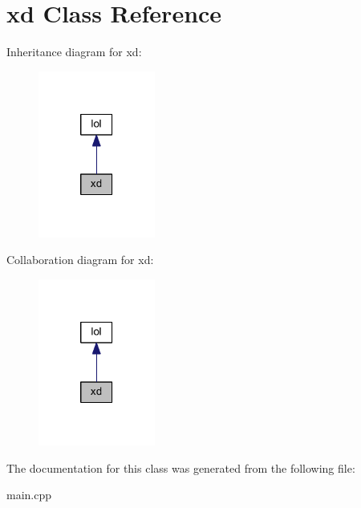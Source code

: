 \hypertarget{classxd}{}\section{xd Class Reference}
\label{classxd}


Inheritance diagram for xd\+:\nopagebreak
\begin{figure}[H]
\begin{center}
\leavevmode
\includegraphics[width=109pt]{classxd__inherit__graph}
\end{center}
\end{figure}


Collaboration diagram for xd\+:\nopagebreak
\begin{figure}[H]
\begin{center}
\leavevmode
\includegraphics[width=109pt]{classxd__coll__graph}
\end{center}
\end{figure}


The documentation for this class was generated from the following file\+:\begin{DoxyCompactItemize}
\item 
main.\+cpp\end{DoxyCompactItemize}
